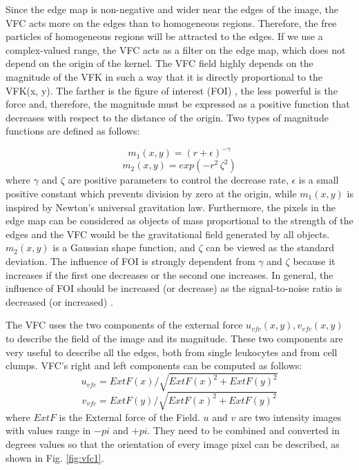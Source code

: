\documentclass[final,a4paper,12pt,english]{UnicaPhdThesis3}
\begin{document}
	Since the edge map is non-negative and wider near the edges of the image, the VFC acts more on the edges than to homogeneous regions. Therefore, the free particles of homogeneous regions will be attracted to the edges. If we use a complex-valued range, the VFC acts as a filter on the edge map, which does not depend on the origin of the kernel. The VFC field highly depends on the magnitude of the VFK in such a way that it is directly proportional to the VFK(x, y). 
	The farther is the figure of interest (FOI) \cite{Bing}, the less powerful is the force and, therefore, the magnitude must be expressed as a positive function that decreases with respect to the distance of the origin. Two types of magnitude functions are defined as follows:
	
	\begin{equation}
	{m} _{1} ( x,y ) =(r+\epsilon) ^{-\gamma}
	\end{equation}
	\begin{equation}
	{m} _{2} ( x,y ) =exp(-r^{2}\, \zeta ^{2})
	\end{equation}
	where $\gamma$ and $\zeta$ are positive parameters to control the decrease rate, $\epsilon$ is a small positive constant which prevents division by zero at the origin, while ${m} _{1} ( x,y )$ is inspired by Newton's universal gravitation law. Furthermore, the pixels in the edge map can be considered as objects of mass proportional to the strength of the edges and the VFC would be the gravitational field generated by all objects. 
	${m} _{2} ( x,y )$ is a Gaussian shape function, and $\zeta$ can be viewed as the standard deviation.
	The influence of FOI is strongly dependent from $\gamma$ and $\zeta$ because it increases if the first one decreases or the second one increases. 
	In general, the influence of FOI should be increased (or decrease) as the signal-to-noise ratio is decreased (or increased) \cite{Bing}.
	
	The VFC uses the two components of the external force ${u} _{vfc} ( x,y ) , {v} _{vfc} (x,y)$ to describe the field of the image and its magnitude. These two components are very useful to describe all the edges, both from single leukocytes and from cell clumps. VFC's right and left components can be computed as follows:
	\begin{equation}
	{u} _{vfc}=ExtF(x)/\sqrt{ExtF(x)^{2} + ExtF(y)^{2}}
	\end{equation}
	\begin{equation}
	{v} _{vfc}=ExtF(y)/\sqrt{ExtF(x)^{2} + ExtF(y)^{2}}
	\end{equation}
	where $ExtF$ is the External force of the Field. $u$ and $v$ are two intensity images with values range in $-pi$ and $+pi$. They need to be combined and converted in degrees values so that the orientation of every image pixel can be described, as shown in Fig. \ref{fig:vfc1}. 
	
\end{document}
